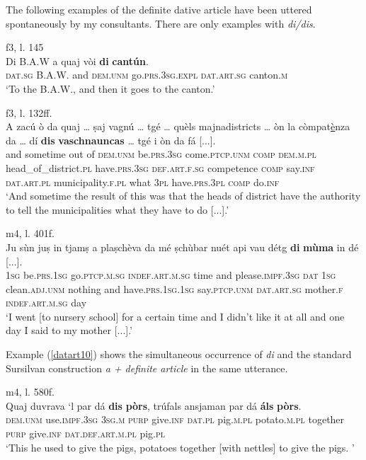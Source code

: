 The following examples of the definite dative article have been uttered spontaneously by my consultants. There are only examples with \textit{di/dis}.

\ea\label{datart7}
 {f3, l. 145}\\
\gll  Di B.A.W a quaj vòi \textbf{di} \textbf{cantún}.\\
\textsc{dat.sg} B.A.W. and \textsc{dem.unm} go.\textsc{prs.3sg.expl} \textsc{dat.art.sg} canton.\textsc{m}\\
\glt `To the B.A.W., and then it goes to the canton.'
\z

\ea\label{datart8}
 {f3, l. 132ff.}\\
\gll A zacú ò da quaj … ṣaj vagnú … tgé … quèls majnadistricts … òn la còmpat\underline{è}nza da … dí \textbf{dis} \textbf{vaschnauncas} … tgé i òn da fá [...].\\
and sometime out of \textsc{dem.unm} {} be.\textsc{prs.3sg} come.\textsc{ptcp.unm} {} \textsc{comp} {} \textsc{dem.m.pl} head\_of\_district.\textsc{pl} {} have.\textsc{prs.3sg} \textsc{def.art.f.sg} competence \textsc{comp} {} say.\textsc{inf}  \textsc{dat.art.pl} municipality.\textsc{f.pl} {} what \textsc{3pl} have.\textsc{prs.3pl}  \textsc{comp} do.\textsc{inf} \\
\glt `And sometime the result of this was that the heads of district have the authority to tell the municipalities what they have to do [...].'
\z

\ea
\label{datart9}
 {m4, l. 401f.}\\
\gll  Ju sùn juṣ in tjamṣ a plaṣchèva da mé ṣchùbar nuét api vau détg \textbf{di} \textbf{mùma} in dé [...]. \\
 \textsc{1sg} be.\textsc{prs.1sg} go.\textsc{ptcp.m.sg} \textsc{indef.art.m.sg} time and please.\textsc{impf.3sg} \textsc{dat} \textsc{1sg} clean.\textsc{adj.unm} nothing and have.\textsc{prs.1sg.1sg} say.\textsc{ptcp.unm} \textsc{dat.art.sg} mother.\textsc{f} \textsc{indef.art.m.sg} day\\
\glt `I went [to nursery school] for a certain time and I didn’t like it at all and one day I said to my mother [...].'
\z

Example (\ref{datart10}) shows the simultaneous occurrence of \textit{di} and the standard Sursilvan construction \textit{a + definite article} in the same utterance.

\ea\label{datart10}
 {m4, l. 580f.}\\
\gll   Quaj duvrava `l par dá \textbf{dis} \textbf{pòrs}, trúfals ansjaman par dá \textbf{áls} \textbf{pòrs}. \\
\textsc{dem.unm} use.\textsc{impf.3sg} \textsc{3sg.m} \textsc{purp} give.\textsc{inf} \textsc{dat.pl} pig.\textsc{m.pl} potato.\textsc{m.pl} together \textsc{purp} give.\textsc{inf}  \textsc{dat.def.art.m.pl} pig.\textsc{pl} \\
\glt `This he used to give the pigs, potatoes together [with nettles] to give the pigs. '
\z
 
